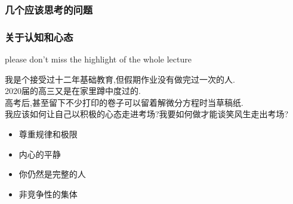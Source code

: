\documentclass[10pt]{beamer}
\begin{document}
\begin{frame}
	\frametitle{几个应该思考的问题}

\end{frame}
\begin{frame}
	\frametitle{关于认知和心态}
	\alert{please don't miss the highlight of the whole lecture}\\
	\vspace{2em}

	我是个接受过十二年基础教育,但假期作业没有做完过一次的人.\\
	2020届的高三又是在家里蹲中度过的.\\
	高考后,甚至留下不少打印的卷子可以留着解微分方程时当草稿纸.\\
	\vspace{0.3em}
	我应该如何让自己以积极的心态走进考场?我要如何做才能谈笑风生走出考场?\\
	\vspace{2em} \pause{}

	\begin{itemize}
		\item 尊重规律和极限
		\item 内心的平静
		\item 你仍然是完整的人
		\item 非竞争性的集体
	\end{itemize}
\end{frame}
\end{document}
